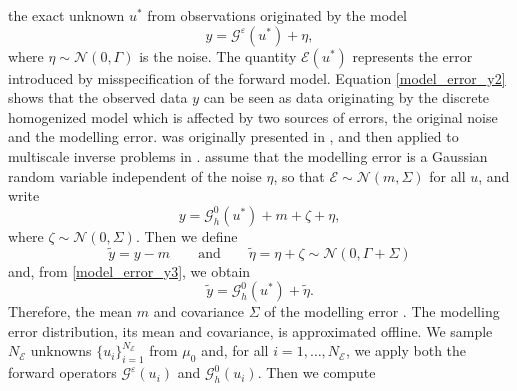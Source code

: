 \documentclass[10pt]{article}
\begin{document}
 the exact unknown $u^*$ from observations originated by the model
\begin{equation}
\label{model_error_y}
y = \mathcal{G}^{\varepsilon}(u^*) + \eta,
\end{equation}
where $\eta \sim \mathcal{N}(0,\Gamma)$ is the noise. 
The quantity $\mathcal{E}(u^*)$ represents the error introduced by misspecification of the forward model. Equation \eqref{model_error_y2} shows that the observed data $y$ can be seen as data originating by the discrete homogenized model which is affected by two sources of errors, the original noise and the modelling error.  was originally presented in \cite{CES14}, and then applied to multiscale inverse problems in \cite{AbD18}.  assume that the modelling error is a Gaussian random variable independent of the noise $\eta$, so that $\mathcal{E} \sim \mathcal{N}(m, \Sigma)$ for all $u$, and write 
\begin{equation}
\label{model_error_y3}
y = \mathcal{G}^0_h(u^*) + m + \zeta + \eta,
\end{equation}
where $\zeta \sim \mathcal{N}(0, \Sigma)$. Then we define
\[ \tilde{y} = y - m \qquad \text{and} \qquad \tilde{\eta} = \eta + \zeta \sim \mathcal{N}(0, \Gamma + \Sigma) \]
and, from \eqref{model_error_y3}, we obtain
\begin{equation}
\label{model_error_y4}
\tilde{y} = \mathcal{G}^0_h(u^*) + \tilde{\eta}.
\end{equation}
Therefore,  the mean $m$ and covariance $\Sigma$ of the modelling error . The modelling error distribution,  its mean and covariance, is approximated offline. We sample $N_{\mathcal{E}}$ unknowns $\{ u_i \}_{i=1}^{N_\mathcal{E}}$ from $\mu_0$ and, for all $i = 1, \dots, N_{\mathcal{E}}$, we apply both the forward operators $\mathcal{G}^{\varepsilon}(u_i)$ and $\mathcal{G}^0_h(u_i)$. Then we compute
\end{document}
